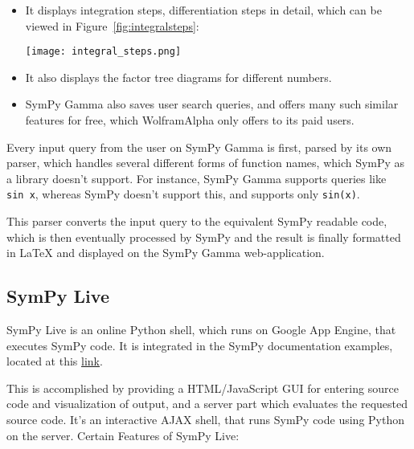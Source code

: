 \begin{itemize}
\item
  It displays integration steps, differentiation steps in detail, which
  can be viewed in Figure~\ref{fig:integralsteps}:\par
\begin{minipage}{\textwidth}
    \centering
    \texttt{[image: integral\_steps.png]}
    \label{fig:integralsteps}
\end{minipage}
\item
  It also displays the factor tree diagrams for different numbers.
\item
  SymPy Gamma also saves user search queries, and offers many such
  similar features for free, which Wolfram\textbar{}Alpha only offers
  to its paid users.
\end{itemize}
Every input query from the user on SymPy Gamma is first, parsed by its
own parser, which handles several different forms of function names,
which SymPy as a library doesn't support. For instance, SymPy Gamma
supports queries like \texttt{sin\ x}, whereas SymPy doesn't support
this, and supports only \verb|sin(x)|.

This parser converts the input query to the equivalent SymPy readable
code, which is then eventually processed by SymPy and the result is
finally formatted in LaTeX and displayed on the SymPy Gamma web-application.

\subsection{SymPy Live}\label{sympy-live}

SymPy Live is an online Python shell, which runs on Google
App Engine, that executes SymPy code. It is integrated in the SymPy
documentation examples, located at this \href{http://docs.sympy.org/latest/index.html}{link}.

This is accomplished by providing a HTML/JavaScript GUI for entering
source code and visualization of output, and a server part which
evaluates the requested source code. It's an interactive AJAX shell,
that runs SymPy code using Python on the server.
\newline
Certain Features of SymPy Live:

